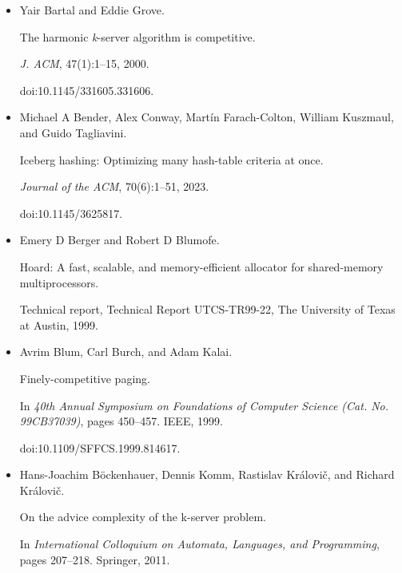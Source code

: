 \begin{itemize}
\item[] 
[6]

Yair Bartal and Eddie Grove.


The harmonic \emph{k}-server algorithm is competitive.


\emph{J. ACM}, 47(1):1–15, 2000.


doi:10.1145/331605.331606.





\item[] 
[7]

Michael A Bender, Alex Conway, Martín Farach-Colton, William Kuszmaul, and
Guido Tagliavini.


Iceberg hashing: Optimizing many hash-table criteria at once.


\emph{Journal of the ACM}, 70(6):1–51, 2023.


doi:10.1145/3625817.





\item[] 
[8]

Emery D Berger and Robert D Blumofe.


Hoard: A fast, scalable, and memory-efficient allocator for
shared-memory multiprocessors.


Technical report, Technical Report UTCS-TR99-22, The University of
Texas at Austin, 1999.





\item[] 
[9]

Avrim Blum, Carl Burch, and Adam Kalai.


Finely-competitive paging.


In \emph{40th Annual Symposium on Foundations of Computer Science
(Cat. No. 99CB37039)}, pages 450–457. IEEE, 1999.


doi:10.1109/SFFCS.1999.814617.





\item[] 
[10]

Hans-Joachim Böckenhauer, Dennis Komm, Rastislav Královič, and
Richard Královič.


On the advice complexity of the k-server problem.


In \emph{International Colloquium on Automata, Languages, and
Programming}, pages 207–218. Springer, 2011.






\end{itemize}
